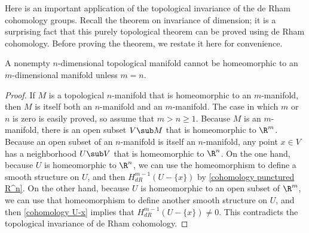Here is an important application of the topological invariance of the de Rham cohomology groups. Recall the theorem on invariance of dimension; it is a surprising fact that this purely topological theorem can be proved using de Rham cohomology. Before proving the theorem, we restate it here for convenience.
\begin{proposition}
A nonempty $n$-dimensional topological manifold cannot be homeomorphic to an $m$-dimensional manifold unless $m=n$.
\end{proposition}
\begin{proof}
If $M$ is a topological $n$-manifold that is homeomorphic to an $m$-manifold, then $M$ is itself both an $n$-manifold and an $m$-manifold. The case in which $m$ or $n$ is zero is easily proved, so assume that $m>n\geq 1$. Because $M$ is an $m$-manifold, there is an open subset $V\sub M$ that is homeomorphic to $\R^m$. Because an open subset of an $n$-manifold is itself an $n$-manifold, any point $x\in V$ has a neighborhood $U\sub V$ that is homeomorphic to $\R^n$. On the one hand, because $U$ is homeomorphic to $\R^n$, we can use the homeomorphism to define a smooth structure
on $U$, and then $H^{m-1}_{dR}(U-\{x\})$ by \cref{cohomology punctured R^n}. On the other hand, because $U$ is homeomorphic to an open subset of $\R^m$, we can use that homeomorphism to define another smooth structure on $U$, and then \cref{cohomology U-x} implies that $H^{m-1}_{dR}(U-\{x\})\neq 0$. This contradicts the topological invariance of de Rham cohomology.
\end{proof}
